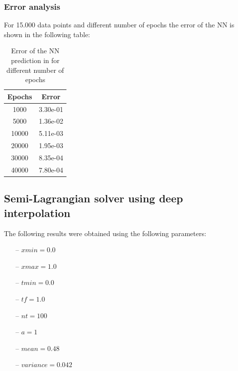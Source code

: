 \documentclass{article}
\begin{document}
\newpage 

\subsubsection*{Error analysis}

For 15.000 data points and different number of epochs the error of the NN is shown in the following table:
\newpage

\begin{table}[!h]
    \centering
    \begin{tabular}{|c|c|}
    \hline
    \textbf{Epochs} & \textbf{Error} \\ \hline
    1000            & 3.30e-01       \\ \hline
    5000            & 1.36e-02       \\ \hline
    10000           & 5.11e-03       \\ \hline
    20000           & 1.95e-03       \\ \hline
    30000           & 8.35e-04        \\ \hline
    40000           & 7.80e-04        \\ \hline
    \end{tabular}
    \caption{Error of the NN prediction in for different number of epochs}
    \label{tab:my-table}

\end{table}



\subsection{Semi-Lagrangian solver using deep interpolation}

The following results were obtained using the following parameters:

\begin{itemize}
    \item[--]$xmin = 0.0$
    \item[--] $xmax = 1.0$
    \item[--] $tmin = 0.0$
    \item[--] $tf = 1.0$
    \item[--] $nt = 100$
    \item[--] $a = 1$
    \item[--] $mean = 0.48$
    \item[--] $variance = 0.042$
\end{itemize}
\end{document}

